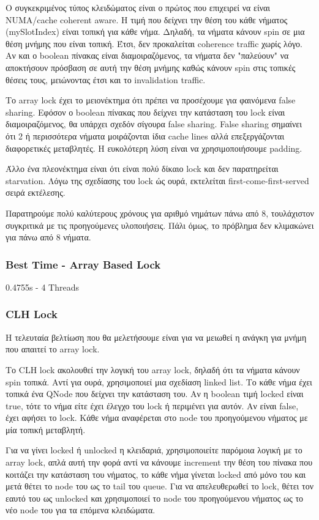 \documentclass[letterpaper,12pt]{article}
\begin{document}
Ο συγκεκριμένος τύπος κλειδώματος είναι ο πρώτος που επιχειρεί να είναι NUMA/cache coherent aware. Η τιμή που δείχνει
την θέση του κάθε νήματος (mySlotIndex) είναι τοπική για κάθε νήμα. Δηλαδή, τα νήματα κάνουν spin σε μια θέση 
μνήμης που είναι τοπική. Έτσι, δεν προκαλείται coherence traffic χωρίς λόγο. Αν και ο boolean πίνακας είναι 
διαμοιραζόμενος, τα νήματα δεν "παλεύουν" να αποκτήσουν πρόσβαση σε αυτή την θέση μνήμης καθώς κάνουν
spin στις τοπικές θέσεις τους, μειώνοντας έτσι και το invalidation traffic.

Το array lock έχει το μειονέκτημα ότι πρέπει να προσέχουμε για φαινόμενα false sharing. Εφόσον ο boolean πίνακας που 
δείχνει την κατάσταση του lock είναι διαμοιραζόμενος, θα υπάρχει σχεδόν σίγουρα false sharing. False sharing 
σημαίνει ότι 2 ή περισσότερα νήματα μοιράζονται ίδια cache lines αλλά επεξεργάζονται διαφορετικές μεταβλητές.
Η ευκολότερη λύση είναι να χρησιμοποιήσουμε padding.

Άλλο ένα πλεονέκτημα είναι ότι είναι πολύ δίκαιο lock και δεν παρατηρείται starvation. Λόγω της σχεδίασης του lock ώς
ουρά, εκτελείται first-come-first-served σειρά εκτέλεσης.

Παρατηρούμε πολύ καλύτερους χρόνους για αριθμό νημάτων πάνω από 8, τουλάχιστον συγκριτικά με τις προηγούμενες υλοποιήσεις. 
Πάλι όμως, το πρόβλημα δεν κλιμακώνει για πάνω από 8 νήματα. 

\subsubsection*{Best Time - Array Based Lock}
0.4755s - 4 Threads

\subsubsection{CLH Lock}

Η τελευταία βελτίωση που θα μελετήσουμε είναι για να μειωθεί η ανάγκη για μνήμη που απαιτεί το array lock.

Το CLH lock ακολουθεί την λογική του array lock, δηλαδή ότι τα νήματα κάνουν spin τοπικά. Αντί για ουρά,
χρησιμοποιεί μια σχεδίαση linked list. Το κάθε νήμα έχει τοπικά ένα QNode που δείχνει την κατάσταση του.
Αν η boolean τιμή locked είναι true, τότε το νήμα είτε έχει έλεγχο του lock ή περιμένει για αυτόν. Αν είναι false,
έχει αφήσει το lock. Κάθε νήμα αναφέρεται στο node του προηγούμενου νήματος με μία τοπική μεταβλητή.

Για να γίνει locked ή unlocked η κλειδαριά, χρησιμοποιείτε παρόμοια λογική με το array lock, απλά αυτή την φορά
αντί να κάνουμε increment την θέση του πίνακα που κοιτάζει την κατάσταση του νήματος, το κάθε νήμα
γίνεται locked από μόνο του και μετά θέτει το node του ως το tail του queue. Για να απελευθερωθεί το lock, 
θέτει τον εαυτό του ως unlocked και χρησιμοποιεί το node του προηγούμενου νήματος ως το νέο node του για 
τα επόμενα κλειδώματα.
\end{document}
